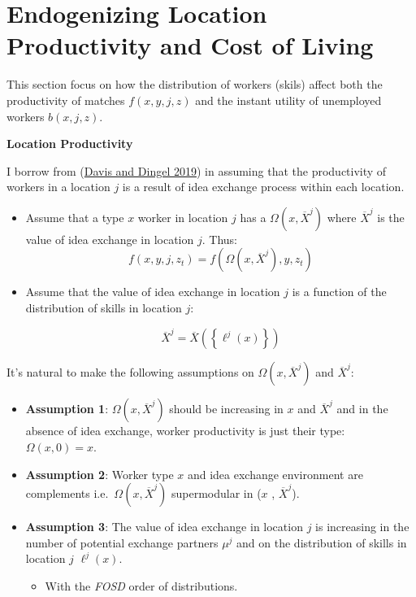 \documentclass[
  letterpaper,
  DIV=11,
  numbers=noendperiod]{scrreprt}
\providecommand{\tightlist}{%
  \setlength{\itemsep}{0pt}\setlength{\parskip}{0pt}}\usepackage{longtable,booktabs,array}
\begin{document}

\hypertarget{endogenizing-location-productivity-and-cost-of-living}{%
\chapter{Endogenizing Location Productivity and Cost of
Living}\label{endogenizing-location-productivity-and-cost-of-living}}

This section focus on how the distribution of workers (skils) affect
both the productivity of matches \(f(x,y,j,z)\) and the instant utility
of unemployed workers \(b(x,j,z)\).

\textbf{Location Productivity}

I borrow from
(\protect\hyperlink{ref-davisSpatialKnowledgeEconomy2019}{Davis and
Dingel 2019}) in assuming that the productivity of workers in a location
\(j\) is a result of idea exchange process within each location.

\begin{itemize}
\item
  Assume that a type \(x\) worker in location \(j\) has a
  \(\Omega(x, \overline{X}^j)\) where \(\overline{X}^j\) is the value of
  idea exchange in location \(j\). Thus:
  \[f(x,y,j,z_t) = f\left(\Omega(x, \overline{X}^j), y, z_t\right)\]
\item
  Assume that the value of idea exchange in location \(j\) is a function
  of the distribution of skills in location \(j\):

  \[ \overline{X}^j = \overline{X}\left(\left\{\ell^j(x)\right\}\right) \]
\end{itemize}

It's natural to make the following assumptions on
\(\Omega(x, \overline{X}^j)\) and \(\overline{X}^j\):

\begin{itemize}
\tightlist
\item
  \textbf{Assumption 1}: \(\Omega(x, \overline{X}^j)\) should be
  increasing in \(x\) and \(\overline{X}^j\) and in the absence of idea
  exchange, worker productivity is just their type:
  \(\Omega(x, 0) = x\).
\item
  \textbf{Assumption 2}: Worker type \(x\) and idea exchange environment
  are complements i.e.~\(\Omega(x, \overline{X}^j)\) supermodular in
  (\(x\) , \(\overline{X}^j\)).
\item
  \textbf{Assumption 3}: The value of idea exchange in location \(j\) is
  increasing in the number of potential exchange partners \(\mu^j\) and
  on the distribution of skills in location \(j\) \(\ell^j(x)\).

  \begin{itemize}
  \tightlist
  \item
    With the \emph{FOSD} order of distributions.
  \end{itemize}
\end{itemize}
\end{document}
